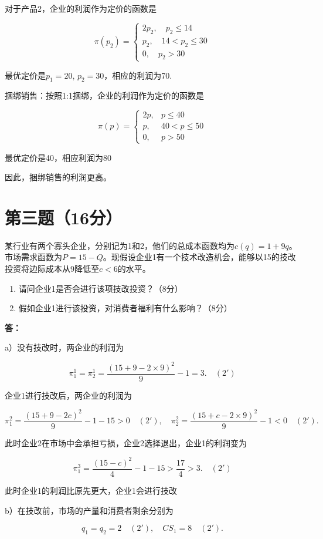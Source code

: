 \documentclass[12pt]{article}
\begin{document}
对于产品2，企业的利润作为定价的函数是

$$\pi(p_2)=\begin{cases}2p_2,\quad p_2\le14\\[2ex]p_2,\quad14<p_2\le30\\[2ex]0,\quad p_2>30\end{cases}$$

最优定价是$p_1= 20$, $p_2= 30$，相应的利润为70.

捆绑销售：按照1:1捆绑，企业的利润作为定价的函数是

$$\pi(p)=\begin{cases}2p,&p\le40\\[2ex]p,&40<p\le50\\[2ex]0,&p>50\end{cases}$$

最优定价是40，相应利润为80

因此，捆绑销售的利润更高。

\section*{第三题（16分）}
某行业有两个寡头企业，分别记为1和2，他们的总成本函数均为$c(q)=1+9q$。市场需求函数为$P=15-Q$。现假设企业1有一个技术改造机会，能够以15的技改投资将边际成本从9降低至$c<6$的水平。

\begin{enumerate}
\item 请问企业1是否会进行该项技改投资？（8分）
\item 假如企业1进行该投资，对消费者福利有什么影响？（8分）
\end{enumerate}

\noindent\textbf{答：}

a）没有技改时，两企业的利润为

$$\pi_1^1=\pi_2^1=\frac{(15+9-2\times9)^2}{9}-1=3.\quad(2')$$

企业1进行技改后，两企业的利润为

$$\pi_1^2=\frac{(15+9-2c)^2}{9}-1-15>0\quad(2'),\quad\pi_2^2=\frac{(15+c-2\times9)^2}{9}-1<0\quad(2').$$

此时企业2在市场中会承担亏损，企业2选择退出，企业1的利润变为

$$\pi_1^3=\frac{(15-c)^2}{4}-1-15>\frac{17}{4}>3.\quad(2')$$

此时企业1的利润比原先更大，企业1会进行技改

b）在技改前，市场的产量和消费者剩余分别为

$$q_1=q_2=2\quad(2'),\quad CS_1=8\quad(2').$$
\end{document}
